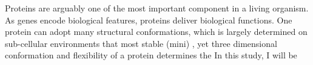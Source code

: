 Proteins are arguably one of the most important component in a living organism. As genes encode biological features, proteins deliver biological functions. One protein can adopt many structural conformations, which is largely determined on sub-cellular environments that most stable (mini) , yet three dimensional conformation and flexibility of a protein determines the     In this study, I will be 